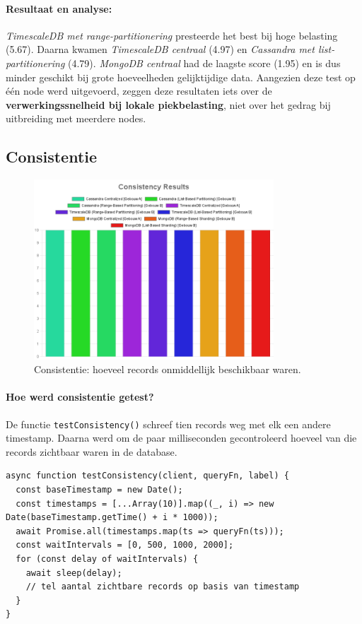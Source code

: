 \paragraph{Resultaat en analyse:}
\textit{TimescaleDB met range-partitionering} presteerde het best bij hoge belasting (5.67). Daarna kwamen \textit{TimescaleDB centraal} (4.97) en \textit{Cassandra met list-partitionering} (4.79). \textit{MongoDB centraal} had de laagste score (1.95) en is dus minder geschikt bij grote hoeveelheden gelijktijdige data. Aangezien deze test op één node werd uitgevoerd, zeggen deze resultaten iets over de \textbf{verwerkingssnelheid bij lokale piekbelasting}, niet over het gedrag bij uitbreiding met meerdere nodes.

\subsection{Consistentie}

\begin{figure}[H]
\centering
\includegraphics[width=0.8\textwidth]{Consistency.png}
\caption{Consistentie: hoeveel records onmiddellijk beschikbaar waren.}
\label{fig:consistency-comparison}
\end{figure}

\paragraph{Hoe werd consistentie getest?}
De functie \texttt{testConsistency()} schreef tien records weg met elk een andere timestamp. Daarna werd om de paar milliseconden gecontroleerd hoeveel van die records zichtbaar waren in de database.

\begin{verbatim}
async function testConsistency(client, queryFn, label) {
  const baseTimestamp = new Date();
  const timestamps = [...Array(10)].map((_, i) => new Date(baseTimestamp.getTime() + i * 1000));
  await Promise.all(timestamps.map(ts => queryFn(ts)));
  const waitIntervals = [0, 500, 1000, 2000];
  for (const delay of waitIntervals) {
    await sleep(delay);
    // tel aantal zichtbare records op basis van timestamp
  }
}
\end{verbatim}

